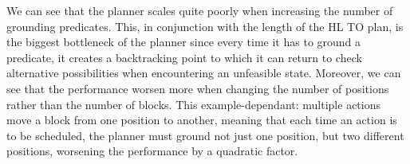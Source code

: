 \newcommand{\mc}[3]{\multicolumn{#1}{#2}{#3}}
\begin{table*}[htp]
    \centering
    
    \caption{Execution times (in milliseconds) for the planning phase on example 5 of the blocks world scenario at the changing of the number of predicates in the \kb.}
    \label{tab:plannerScalability}
\end{table*}

We can see that the planner scales quite poorly when increasing the number of grounding predicates. This, in conjunction with the length of the HL TO plan, is the biggest bottleneck of the planner since every time it has to ground a predicate, it creates a backtracking point to which it can return to check alternative possibilities when encountering an unfeasible state. Moreover, we can see that the performance worsen more when changing the number of positions rather than the number of blocks. This example-dependant: multiple actions move a block from one position to another, meaning that each time an action is to be scheduled, the planner must ground not just one position, but two different positions, worsening the performance by a quadratic factor. 

